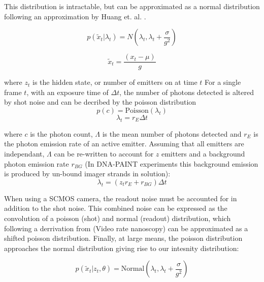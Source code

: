   This distribution is intractable, but can be approximated as a normal distribution 
  following an approximation by Huang et. al. \cite{huang_video-rate_2013}.

  \begin{equation}
    p(\tilde{x}_{t}| \lambda_{t}) = N \left(\lambda_{t}, \lambda_{t} + \frac{\sigma}{g^{2}} \right)
    \label{eq:method:intensity_distribution}
  \end{equation}
  
  \begin{equation*}
    \tilde{x}_{t} = \frac{(x_{t} - \mu)}{g}
  \end{equation*}



    where $z_{t}$ is the hidden state, or number of emitters on at time $t$
For a single frame $t$, with an exposure time of $\Delta t$, 
the number of photons detected is altered by shot noise and can be decribed 
by the poisson distribution 
%
\begin{equation*}
  p(c) = \text{Poisson}(\lambda_{t})
\end{equation*}
\begin{equation*}
  \lambda_{t} = r_{E} \Delta t
\end{equation*}


where $c$ is the photon count, $\Lambda$ is the mean number of photons detected 
and $r_{E}$ is the photon emission rate of an active emitter.
%
Assuming that all emitters are independant, $\Lambda$ can be re-written 
to account for $z$ emitters and a background photon emission rate 
$r_{BG}$ (In DNA-PAINT experiments this background emission is produced 
by un-bound imager strands in solution):
%
\begin{equation*}
	\lambda_{t} = (z_{t} r_{E} + r_{BG})\Delta t
\end{equation*}

When using a SCMOS camera, the readout noise must be accounted for in addition to the shot noise. 
This combined noise can be expressed as the convolution of a poisson (shot) and normal (readout) distribution,
which following a derrivation from (Video rate nanoscopy) can be approximated as a shifted poisson distribution.
Finally, at large means, the poisson distribution approaches the normal distribution giving rise to our intesnity distribution:

\begin{equation}
  p(\tilde{x}_{t}| z_{t}, \theta) = \text{Normal} \left(\lambda_{t}, \lambda_{t} + \frac{\sigma}{g^{2}} \right)
  \label{eq:method:intensity_distribution}
\end{equation}

